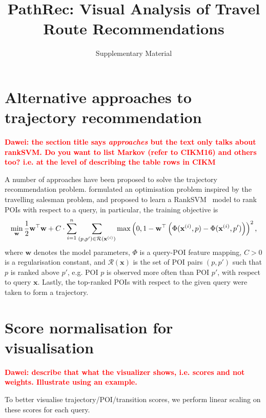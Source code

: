 \documentclass[sigconf]{acmart}
\newcommand{\TODO}[1]{\textcolor{red}{\bf{#1}}}
\begin{document}
\title{PathRec: Visual Analysis of Travel Route Recommendations}
\subtitle{Supplementary Material}
\maketitle

\thispagestyle{empty}

\appendix

\section{Alternative approaches to trajectory recommendation}
\label{sec:alternative}

\TODO{Dawei: the section title says {\em approaches} but the text only talks about rankSVM. Do you want to list Markov (refer to CIKM16) and others too? i.e. at the level of describing the table rows in CIKM}

A number of approaches have been proposed to solve the trajectory recommendation problem.
\citet{ijcai15} formulated an optimisation problem inspired by the travelling salesman problem,
and \citet{cikm16paper} proposed to learn a RankSVM~\cite{lranksvm} model to rank POIs with respect to a query,
in particular, 
the training objective is
\begin{equation*}
\resizebox{\linewidth}{!}{$\displaystyle
\min_{\mathbf{w}} \frac{1}{2} \mathbf{w}^\top \mathbf{w} + C \cdot \sum_{i=1}^n \sum_{(p,p') \in \mathcal{R}(\mathbf{x}^{(i)})}
          \max\left(0, 1 - \mathbf{w}^\top \left(\Phi(\mathbf{x}^{(i)}, p) - \Phi(\mathbf{x}^{(i)}, p') \right) \right)^2,
$}
\end{equation*}
where $\mathbf{w}$ denotes the model parameters, $\Phi$ is a query-POI feature mapping, $C > 0$ is a regularisation constant,
and $\mathcal{R}(\mathbf{x})$ is the set of POI pairs $(p, p')$ such that $p$ is ranked above $p'$,
e.g. POI $p$ is observed more often than POI $p'$, with respect to query $\mathbf{x}$.
Lastly, the top-ranked POIs with respect to the given query were taken to form a trajectory.

\section{Score normalisation for visualisation}
\label{sec:scorenorm}

\TODO{Dawei: describe that what the visualizer shows, i.e. scores and not weights. Illustrate using an example.}

To better visualise trajectory/POI/transition scores, we perform linear scaling on these scores for each query.
\end{document}
